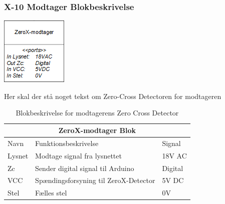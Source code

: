 \documentclass[11pt]{article}
\begin{document}
\subsubsection{X-10 Modtager Blokbeskrivelse}



\begin{minipage}[Ht]{0.45\linewidth}
	\centering
	\includegraphics{ZeroX-modtager-blok.png}
\end{minipage}
\hfill
\begin{minipage}[!t]{0.45\linewidth}
	\centering
   Her skal der stå noget tekst om Zero-Cross Detectoren for modtageren
\end{minipage}%
\hfill

\begin{table}[H]
\centering
	\begin{tabular}{l|l|l}
	
	\toprule[0.4mm]\midrule \multicolumn{3}{c}{\textbf{ZeroX-modtager Blok}}\\
	\midrule[0.4mm] Navn & Funktionsbeskrivelse & Signal\\ \midrule[0.3mm]
	 Lysnet & Modtage signal fra lysnettet & 18V AC\\
	 Zc & Sender digital signal til Arduino & Digital\\
	 VCC & Spændingsforsyning til ZeroX-Detector & 5V DC\\
	 Stel & Fælles stel  & 0V\\
	 \midrule\bottomrule[0.4mm]

	\end{tabular}
	\caption{Blokbeskrivelse for modtagerens Zero Cross Detector}
	\label{tab: Bloktabel ZeroX modtager}
\end{table}
\qquad
\end{document}
